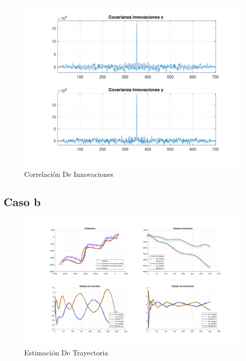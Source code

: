 	\begin{figure}[H]
		\centering
		\includegraphics[width=1.0\textwidth,keepaspectratio]{Figuras/covinn_ej4a.pdf}
		\caption{Correlación De Innovaciones}
		\label{fig:ej4a_cov}
	\end{figure}
	

\subsection{Caso b}

	\begin{figure}[H]
		\centering
		\includegraphics[width=1.0\textwidth,keepaspectratio]{Figuras/graf_ej4b.pdf}
		\caption{Estimación De Trayectoria}
		\label{fig:ej4b}
	\end{figure}
	
